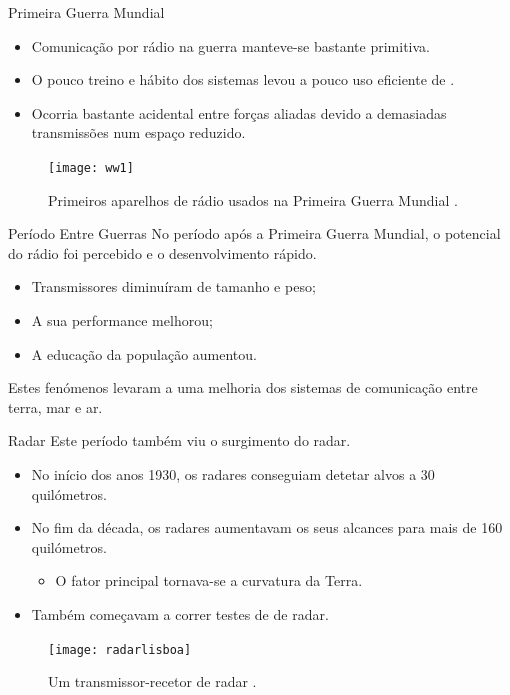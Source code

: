 \documentclass[portuguese,10pt]{beamer}
\begin{document}
\begin{frame}{Primeira Guerra Mundial}
    \begin{itemize}
        \item Comunicação por rádio na guerra manteve-se bastante primitiva.
        \item O pouco treino e hábito dos sistemas levou a pouco uso eficiente de \jamming{}.
        \item Ocorria bastante \jamming{} acidental entre forças aliadas devido a demasiadas transmissões num espaço reduzido.
    \end{itemize}
    \begin{figure}
        \centering
        \texttt{[image: ww1]}
        \caption{Primeiros aparelhos de rádio usados na Primeira Guerra Mundial \cite{worldwar1}.}
        \label{fig:ww1}
    \end{figure}
\end{frame}

\begin{frame}{Período Entre Guerras}
    No período após a Primeira Guerra Mundial, o potencial do rádio foi percebido e o desenvolvimento rápido.
    \begin{itemize}
        \item Transmissores diminuíram de tamanho e peso;
        \pause
        \item A sua performance melhorou;
        \pause
        \item A educação da população aumentou.
    \end{itemize}
    \pause
    Estes fenómenos levaram a uma melhoria dos sistemas de comunicação entre terra, mar e ar.
\end{frame}

\begin{frame}{Radar}
    Este período também viu o surgimento do radar.
    \begin{itemize}
        \item<1-> No início dos anos 1930, os radares conseguiam detetar alvos a 30 quilómetros.
        \item<2-> No fim da década, os radares aumentavam os seus alcances para mais de 160 quilómetros.
        \begin{itemize}
            \item O fator principal tornava-se a curvatura da Terra.
        \end{itemize}
        \item<3-> Também começavam a correr testes de \jamming{} de radar.
    \end{itemize}
    \begin{figure}
        \centering
        \texttt{[image: radarlisboa]}
        \caption{Um transmissor-recetor de radar \cite{radarlisboa}.}
        \label{fig:radarlisboa}
    \end{figure}
\end{frame}
\end{document}
